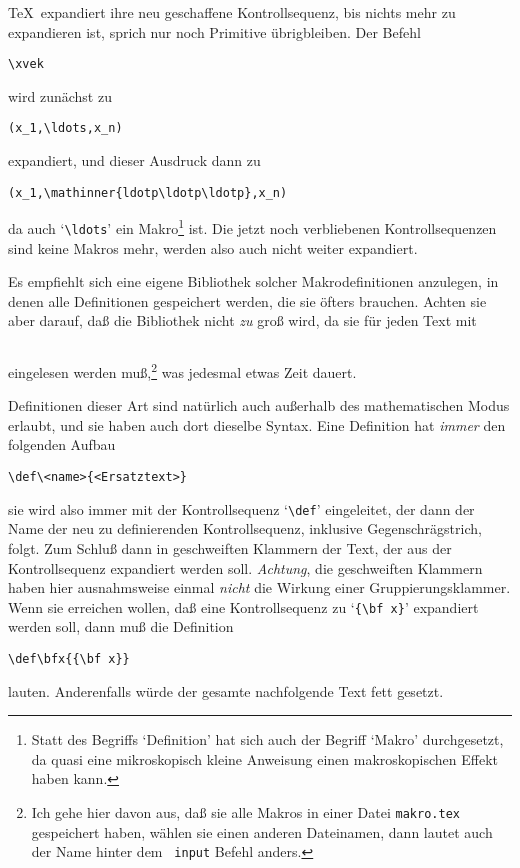 \TeX\ expandiert ihre neu geschaffene 
Kontrollsequenz, bis nichts mehr
zu expandieren ist, sprich nur noch 
Primitive \"ubrigbleiben. Der Befehl
\begin{verbatim}
\xvek
\end{verbatim}
wird zun\"achst zu
\begin{verbatim}
(x_1,\ldots,x_n)
\end{verbatim}
expandiert, und dieser Ausdruck dann zu
\begin{verbatim}
(x_1,\mathinner{ldotp\ldotp\ldotp},x_n)
\end{verbatim}
da auch 
`\verb|\ldots|' ein Makro\footnote{Statt des Begriffs
`Definition' hat sich auch der Begriff `Makro' durchgesetzt, da quasi
eine mikroskopisch kleine Anweisung einen makroskopischen Effekt haben
kann.} ist. Die jetzt noch verbliebenen 
Kontrollsequenzen sind keine
Makros mehr, werden also auch nicht weiter expandiert.

Es empfiehlt sich eine eigene 
Bibliothek solcher Makrodefinitionen
anzulegen, in denen alle Definitionen gespeichert werden, die sie
\"ofters brauchen. Achten sie aber darauf, da\ss{} die Bibliothek nicht {\em
zu} gro\ss{} wird, da sie f\"ur jeden Text mit
\begin{verbatim}

\end{verbatim} eingelesen werden mu\ss{},\footnote{Ich gehe hier davon aus,
da\ss{} sie alle Makros in einer Datei {\tt makro.tex} gespeichert haben,
w\"ahlen sie einen anderen Dateinamen, dann lautet auch der Name hinter
dem {\tt{} input} Befehl anders.} was jedesmal etwas Zeit dauert.

Definitionen dieser Art sind nat\"urlich auch au\ss{}erhalb des
mathematischen Modus erlaubt, und sie haben auch dort dieselbe Syntax.
Eine Definition hat {\em immer} den folgenden Aufbau
\begin{verbatim}
\def\<name>{<Ersatztext>}
\end{verbatim}
sie wird also immer mit der 
Kontrollsequenz `\verb|\def|' eingeleitet,
der dann der Name der neu zu definierenden Kontrollsequenz, inklusive
Gegenschr\"agstrich, folgt. Zum Schlu\ss{} dann in geschweiften
Klammern der
Text, der aus der Kontrollsequenz expandiert werden soll. {\em
Achtung}, die geschweiften Klammern haben hier ausnahmsweise einmal
{\em nicht} die Wirkung einer Gruppierungsklammer. Wenn sie erreichen
wollen, da\ss{} eine Kontrollsequenz zu `\verb|{\bf x}|' expandiert werden
soll, dann mu\ss{} die Definition
\begin{verbatim}
\def\bfx{{\bf x}}
\end{verbatim}
lauten. Anderenfalls w\"urde der gesamte nachfolgende Text
fett gesetzt.
